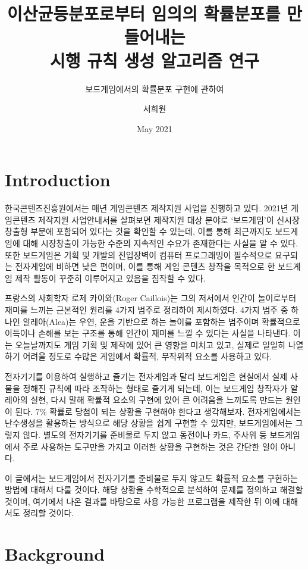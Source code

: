 \documentclass[11pt]{article}
\title{이산균등분포로부터 임의의 확률분포를 만들어내는\\시행 규칙 생성 알고리즘 연구}
\subtitle{보드게임에서의 확률분포 구현에 관하여}
\author{서희원}
\date{May 2021}
\begin{document}
\maketitle
\doublespacing

\section{Introduction}
한국콘텐츠진흥원에서는 매년 게임콘텐츠 제작지원 사업을 진행하고 있다. 2021년 게임콘텐츠 제작지원 사업안내서를 살펴보면 제작지원 대상 분야로 `보드게임'이 신시장창출형 부문에 포함되어 있다는 것\cite{contents2021}을 확인할 수 있는데, 이를 통해 최근까지도 보드게임에 대해 시장창출이 가능한 수준의 지속적인 수요가 존재한다는 사실을 알 수 있다. 또한 보드게임은 기획 및 개발의 진입장벽이 컴퓨터 프로그래밍이 필수적으로 요구되는 전자게임에 비하면 낮은 편이며, 이를 통해 게임 콘텐츠 창작을 목적으로 한 보드게임 제작 활동이 꾸준히 이루어지고 있음을 짐작할 수 있다.

프랑스의 사회학자 로제 카이와(Roger Caillois)는 그의 저서에서 인간이 놀이로부터 재미를 느끼는 근본적인 원리를 4가지 범주로 정리하여 제시하였다.\cite{rogercaillois} 4가지 범주 중 하나인 알레아(Alea)는 우연, 운을 기반으로 하는 놀이를 포함하는 범주이며 확률적으로 이득이나 손해를 보는 구조를 통해 인간이 재미를 느낄 수 있다는 사실을 나타낸다. 이는 오늘날까지도 게임 기획 및 제작에 있어 큰 영향을 미치고 있고, 실제로 일일히 나열하기 어려울 정도로 수많은 게임에서 확률적, 무작위적 요소를 사용하고 있다.

전자기기를 이용하여 실행하고 즐기는 전자게임과 달리 보드게임은 현실에서 실제 사물을 정해진 규칙에 따라 조작하는 형태로 즐기게 되는데, 이는 보드게임 창작자가 알레아의 실현, 다시 말해 확률적 요소의 구현에 있어 큰 어려움을 느끼도록 만드는 원인이 된다. 7\% 확률로 당첨이 되는 상황을 구현해야 한다고 생각해보자. 전자게임에서는 난수생성을 활용하는 방식으로 해당 상황을 쉽게 구현할 수 있지만, 보드게임에서는 그렇지 않다. 별도의 전자기기를 준비물로 두지 않고 동전이나 카드, 주사위 등 보드게임에서 주로 사용하는 도구만을 가지고 이러한 상황을 구현하는 것은 간단한 일이 아니다.

이 글에서는 보드게임에서 전자기기를 준비물로 두지 않고도 확률적 요소를 구현하는 방법에 대해서 다룰 것이다. 해당 상황을 수학적으로 분석하여 문제를 정의하고 해결할 것이며, 여기에서 나온 결과를 바탕으로 사용 가능한 프로그램을 제작한 뒤 이에 대해서도 정리할 것이다.

\section{Background}
\end{document}
